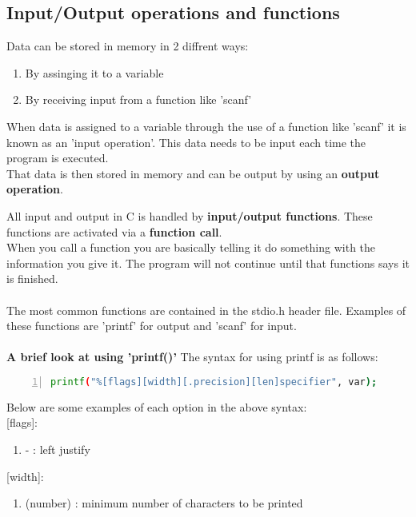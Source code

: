 \documentclass[12pt, letterpaper]{report}
\begin{document}
\subsection{Input/Output operations and functions}
Data can be stored in memory in 2 diffrent ways:
\begin{enumerate}
	\item By assinging it to a variable
	\item By receiving input from a function like 'scanf'
\end{enumerate}

When data is assigned to a variable through the use of a function like 'scanf' 
it is known as an 'input operation'. This data needs to be input each time the 
program is executed.\\
That data is then stored in memory and can be output by using an \textbf{output operation}.

All input and output in C is handled by \textbf{input/output functions}. These 
functions are activated via a \textbf{function call}. \\
When you call a function you are basically telling it do something with the 
information you give it. The program will not continue until that functions 
says it is finished.\\\\

The most common functions are contained in the stdio.h header file. Examples 
of these functions are 'printf' for output and 'scanf' for input.\\\\

\textbf{A brief look at using 'printf()'}
The syntax for using printf is as follows: 
\begin{lstlisting}[language=Bash,framexleftmargin=5mm,frame=single,xleftmargin=18pt,numbers=left,numberstyle=\tiny]
printf("%[flags][width][.precision][len]specifier", var);
\end{lstlisting}
Below are some examples of each option in the above syntax:\\

[flags]: 
\begin{enumerate}
	\item - : left justify
\end{enumerate}

[width]: 
\begin{enumerate}
	\item (number) : minimum number of characters to be printed
\end{enumerate}
\end{document}
